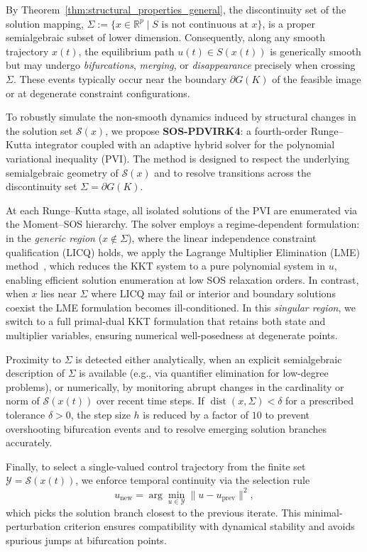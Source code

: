 \documentclass[sn-basic,Numbered]{sn-jnl}
\theoremstyle{thmstyleone}%
\begin{document}
By Theorem~\ref{thm:structural_properties_general}, the discontinuity set of the solution mapping,
$\Sigma := \{ x \in \mathbb{R}^p \mid S \text{ is not continuous at } x \}$,
is a proper semialgebraic subset of lower dimension. Consequently, along any smooth trajectory $x(t)$, the equilibrium path $u(t) \in S(x(t))$ is generically smooth but may undergo \emph{bifurcations}, \emph{merging}, or \emph{disappearance} precisely when crossing $\Sigma$. These events typically occur near the boundary $\partial G(K)$ of the feasible image or at degenerate constraint configurations.


To robustly simulate the non-smooth dynamics induced by structural changes in the solution set $\mathcal{S}(x)$, we propose \textbf{SOS-PDVIRK4}: a fourth-order Runge–Kutta integrator coupled with an adaptive hybrid solver for the polynomial variational inequality (PVI). The method is designed to respect the underlying semialgebraic geometry of $\mathcal{S}(x)$ and to resolve transitions across the discontinuity set $\Sigma = \partial G(K)$.

At each Runge–Kutta stage, all isolated solutions of the PVI are enumerated via the Moment–SOS hierarchy. The solver employs a regime-dependent formulation:
in the \emph{generic region} ($x \notin \Sigma$), where the linear independence constraint qualification (LICQ) holds, we apply the Lagrange Multiplier Elimination (LME) method~\cite{Nie2025}, which reduces the KKT system to a pure polynomial system in $u$, enabling efficient solution enumeration at low SOS relaxation orders.
In contrast, when $x$ lies near $\Sigma$ where LICQ may fail or interior and boundary solutions coexist the LME formulation becomes ill-conditioned. In this \emph{singular region}, we switch to a full primal-dual KKT formulation that retains both state and multiplier variables, ensuring numerical well-posedness at degenerate points.

Proximity to $\Sigma$ is detected either analytically, when an explicit semialgebraic description of $\Sigma$ is available (e.g., via quantifier elimination for low-degree problems), or numerically, by monitoring abrupt changes in the cardinality or norm of $\mathcal{S}(x(t))$ over recent time steps. If $\operatorname{dist}(x, \Sigma) < \delta$ for a prescribed tolerance $\delta > 0$, the step size $h$ is reduced by a factor of $10$ to prevent overshooting bifurcation events and to resolve emerging solution branches accurately.

Finally, to select a single-valued control trajectory from the finite set $\mathcal{Y} = \mathcal{S}(x(t))$, we enforce temporal continuity via the selection rule
\begin{equation}
u_{\text{new}} = \arg\min_{u \in \mathcal{Y}} \| u - u_{\text{prev}} \|^2,
\tag{SEL}
\end{equation}
which picks the solution branch closest to the previous iterate. This minimal-perturbation criterion ensures compatibility with dynamical stability and avoids spurious jumps at bifurcation points.
\end{document}
